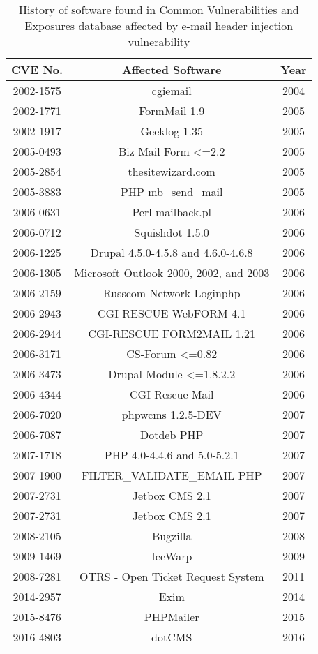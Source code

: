 \begin{table}[tbp]
	\centering
	\begin{tabular}{|c|c|c|}
		\hline
		\multicolumn{1}{|c|}{\textbf{CVE No.}} & 
		\multicolumn{1}{c|}{\textbf{Affected Software}} &
		\multicolumn{1}{c|}{\textbf{Year}}\\
		\hline
		{2002-1575} & {cgiemail} & {2004}\\
		\hline
		{2002-1771} & {FormMail 1.9} & {2005}\\
		\hline
		{2002-1917} & {Geeklog 1.35} & {2005}\\
		\hline
		{2005-0493} & {Biz Mail Form <=2.2} & {2005}\\
		\hline
		{2005-2854} & {thesitewizard.com} & {2005}\\
		\hline
		{2005-3883} & {PHP mb\_send\_mail} & {2005}\\
		\hline
		{2006-0631} & {Perl mailback.pl} & {2006}\\
		\hline
		{2006-0712} & {Squishdot 1.5.0} & {2006}\\
		\hline
		{2006-1225} & {Drupal 4.5.0-4.5.8 and 4.6.0-4.6.8} & {2006}\\
		\hline
		{2006-1305} & {Microsoft Outlook 2000, 2002, and 2003} & {2006}\\
		\hline
		{2006-2159} & {Russcom Network Loginphp} & {2006}\\
		\hline
		{2006-2943} & {CGI-RESCUE WebFORM 4.1} & {2006}\\
		\hline
		{2006-2944} & {CGI-RESCUE FORM2MAIL 1.21} & {2006}\\
		\hline
		{2006-3171} & {CS-Forum <=0.82} & {2006}\\
		\hline
		{2006-3473} & {Drupal Module <=1.8.2.2} & {2006}\\
		\hline
		{2006-4344} & {CGI-Rescue Mail} & {2006}\\
		\hline
		{2006-7020} & {phpwcms 1.2.5-DEV} & {2007}\\
		\hline
		{2006-7087} & {Dotdeb PHP} & {2007}\\
		\hline
		{2007-1718} & {PHP 4.0-4.4.6 and 5.0-5.2.1} & {2007}\\
		\hline
		{2007-1900} & {FILTER\_VALIDATE\_EMAIL PHP} & {2007}\\
		\hline
		{2007-2731} & {Jetbox CMS 2.1} & {2007}\\
		\hline
		{2007-2731} & {Jetbox CMS 2.1} & {2007}\\
		\hline
		{2008-2105} & {Bugzilla} & {2008}\\
		\hline
		{2009-1469} & {IceWarp} & {2009}\\
		\hline
		{2008-7281} & {OTRS - Open Ticket Request System} & {2011}\\
		\hline
		{2014-2957} & {Exim} & {2014}\\
		\hline
		{2015-8476} & {PHPMailer} & {2015}\\
		\hline
		{2016-4803} & {dotCMS} & {2016}\\
		\hline

	\end{tabular}
	\caption{History of software found in Common Vulnerabilities and Exposures database affected by e-mail header injection vulnerability}
	\label{tab:history}
\end{table}
